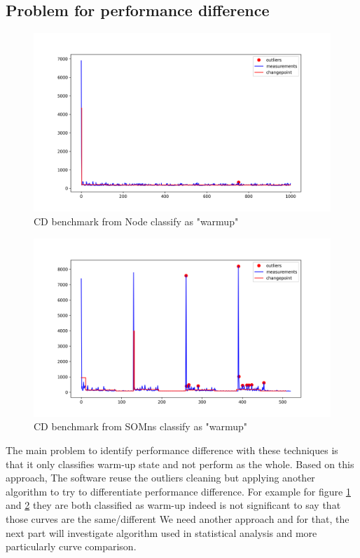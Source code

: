 \documentclass[12pt,a4paper]{article}
\begin{document}
\subsection{Problem for performance difference}

\begin{figure}[h!]
    \centering
    \includegraphics[width=1\textwidth]{images/plot_6_flat.png}
    \caption{CD benchmark from Node classify as "warmup" }
    \label{fig:bench_node_flat}
\end{figure}



\begin{figure}[h!]
    \centering
    \includegraphics[width=1\textwidth]{images/plot_10_flat.png}
    \caption{CD benchmark from SOMns classify as "warmup"}
    \label{fig:bench_somns_flat}
\end{figure}


The main problem to identify performance difference with these techniques is that it only classifies warm-up state and not perform as the whole. Based on this approach, The software reuse the outliers cleaning but applying another algorithm to try to differentiate performance difference. For example for figure \ref{fig:bench_node_flat} and \ref{fig:bench_somns_flat} they are both classified as warm-up indeed is not significant to say that those curves are the same/different We need another approach and for that, the next part will investigate algorithm used in statistical analysis and more particularly curve comparison.
\end{document}

